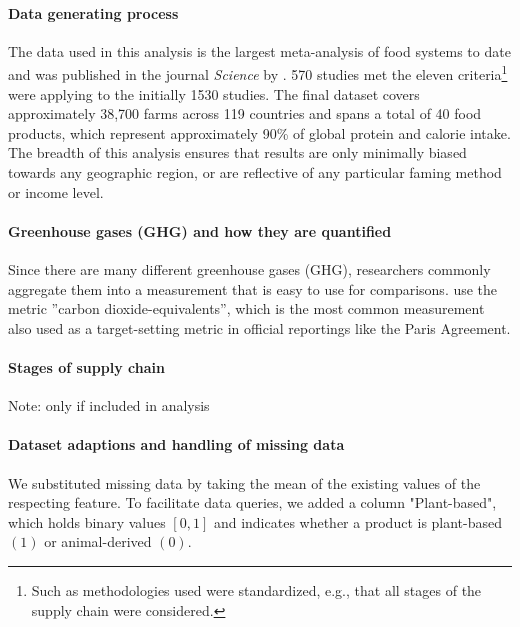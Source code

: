 \documentclass{article}
\begin{document}
\paragraph{Data generating process} \label{dataGen}
The data used in this analysis  is the largest meta-analysis of food systems to date and was published in the journal \textit{Science} by \citet{Poore2018}.
570 studies met the eleven criteria\footnote{Such as  methodologies used were standardized, e.g., that all stages of the supply chain were considered.} \citet{Poore2018}  were applying to the initially  1530 studies.
The final dataset covers approximately 38,700 farms across 119 countries and spans a total of 40 food products, which represent approximately 90\% of global protein and calorie intake. The breadth of this analysis ensures that results are only minimally biased towards any geographic region, or are reflective of any particular faming method or income level.
\paragraph*{Greenhouse gases (GHG) and how they are quantified}
Since there are many different greenhouse gases (GHG), researchers commonly aggregate them into a measurement that is easy to use for comparisons. 
\citet{Poore2018} use the metric 
''carbon dioxide-equivalents'', which is the most common measurement also used as a target-setting metric in official reportings like the Paris Agreement.  
\paragraph{Stages of supply chain}
Note: only if included in analysis



\paragraph{Dataset adaptions and handling of missing data}

We substituted  missing  data by taking the mean of the existing values of the respecting feature. To facilitate data queries, we added a column "Plant-based", which holds binary values $[0,1]$ and indicates whether a product is plant-based $(1)$ or animal-derived $(0)$.
\end{document}
